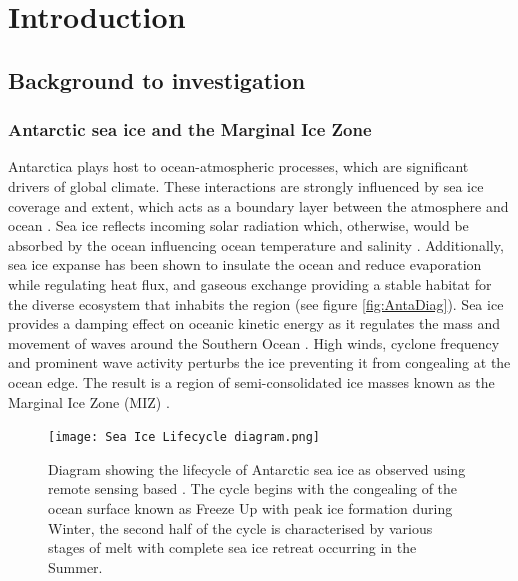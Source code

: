 \chapter{Introduction}
\label{ch:ch1}
\section{Background to investigation}
\label{sec:ch1.section1}

\subsection{Antarctic sea ice and the Marginal Ice Zone}
Antarctica plays host to ocean-atmospheric processes, which are significant drivers of global climate. These interactions are strongly influenced by sea ice coverage and extent, which acts as a boundary layer between the atmosphere and ocean \cite{parkinson2004southern}. Sea ice reflects incoming solar radiation which, otherwise, would be absorbed by the ocean influencing ocean temperature and salinity \cite{parkinson2004southern}. Additionally, sea ice expanse has been shown to insulate the ocean and reduce evaporation while regulating heat flux, and gaseous exchange \cite{deconto2003rapid} providing a stable habitat for the diverse ecosystem that inhabits the region \cite{arrigo2004large} (see figure \ref{fig:AntaDiag}). Sea ice provides a damping effect on oceanic kinetic energy as it regulates the mass and movement of waves around the Southern Ocean \cite{parkinson2004southern,roach2020antarctic}. High winds, cyclone frequency and prominent wave activity perturbs the ice preventing it from congealing at the ocean edge. The result is a region of semi-consolidated ice masses known as the Marginal Ice Zone (MIZ) \cite{wadhams1987ice}.

\begin{figure}[H]
	\centering
	\texttt{[image: Sea Ice Lifecycle diagram.png]}
	\caption{Diagram showing the lifecycle of Antarctic sea ice as observed using remote sensing based \textcite{barber2005microwave}. The cycle begins with the congealing of the ocean surface known as Freeze Up with peak ice formation during Winter, the second half of the cycle is characterised by various stages of melt with complete sea ice retreat occurring in the Summer.}
	\label{fig:ice_diag}
\end{figure}

